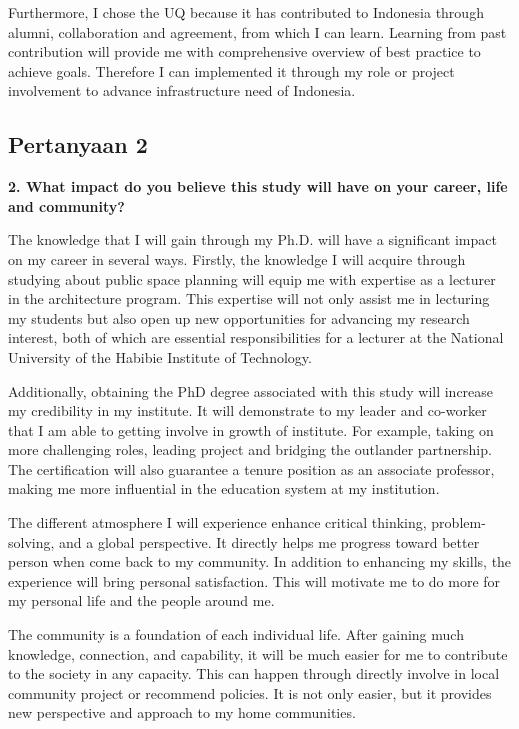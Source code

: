 \documentclass[../main.tex]{subfiles}
\begin{document}
Furthermore, I chose the UQ because it has contributed to  Indonesia through alumni, collaboration and agreement, from which I can learn. Learning from past contribution will provide me with comprehensive overview of best practice to achieve goals.
Therefore I can implemented it through my role or project involvement to advance infrastructure need of Indonesia.

\subsection*{Pertanyaan 2}%
\label{sub:Pertanyaan 2}

\textbf{2. What impact do you believe this study will have on your career, life and community?}

The knowledge that I will gain through my Ph.D. will have a significant impact on my career in several ways. Firstly, the knowledge I will acquire through studying about public space planning will equip me with expertise as a lecturer in the architecture program.
This expertise will not only assist me in lecturing my students but also open up new opportunities for advancing my research interest, both of which are essential responsibilities for a lecturer at the National University of the Habibie Institute of Technology.

Additionally, obtaining the PhD degree associated with this study will increase my credibility in my institute.
It will demonstrate to my leader and co-worker that I am able to getting involve in growth of institute.
For example, taking on more challenging roles, leading project and  bridging the outlander partnership.
The certification will also guarantee a tenure position as an associate professor, making me more influential in the education system at my institution.

The different atmosphere I will experience enhance critical thinking, problem-solving, and a global perspective. It directly helps me progress toward better person when come back to my community.
In addition to enhancing my skills, the experience will bring personal satisfaction.
This will motivate me to do more for my personal life and the people around me.

The community is a foundation of each individual life. After gaining much knowledge, connection, and capability, it will be much easier for me to contribute to the society in any capacity. This can happen through directly involve in local community project or recommend policies. It is not only easier, but it provides new perspective and approach to my home communities.
\end{document}
